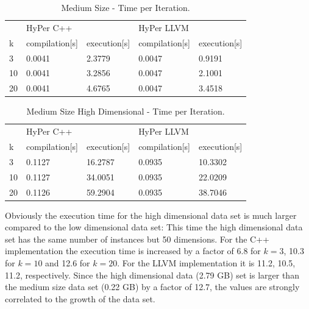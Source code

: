 \begin{table}[htsb]
  \caption[Medium Size - Time per Iteration (Serial)]{Medium Size - Time per Iteration.}
  \label{tab:med_serial}
  \centering
  \begin{tabular}{l l l l l}
    \toprule
      & HyPer C++ & & HyPer LLVM & \\
      k & compilation[s] & execution[s] & compilation[s] & execution[s] \\
    \midrule
      3  & 0.0041 & 2.3779 & 0.0047 & 0.9191 \\
      10 & 0.0041 & 3.2856 & 0.0047 & 2.1001 \\
      20 & 0.0041 & 4.6765 & 0.0047 & 3.4518 \\
    \bottomrule
  \end{tabular}
\end{table}


\begin{table}[htsb]
  \caption[Medium Size High Dimensional - Time per Iteration (Serial)]{Medium Size High Dimensional - Time per Iteration.}
  \label{tab:med_hd_serial}
  \centering
  \begin{tabular}{l l l l l}
    \toprule
      & HyPer C++ & & HyPer LLVM & \\
      k & compilation[s] & execution[s] & compilation[s] & execution[s] \\
    \midrule
      3  & 0.1127 & 16.2787 & 0.0935 & 10.3302 \\
      10 & 0.1127 & 34.0051 & 0.0935 & 22.0209 \\
      20 & 0.1126 & 59.2904 & 0.0935 & 38.7046 \\
    \bottomrule
  \end{tabular}
\end{table}

Obviously the execution time for the high dimensional data set is much larger compared to the low dimensional data set: This time the high dimensional data set has the same number of instances but 50 dimensions. For the C++ implementation the execution time is increased by a factor of 6.8 for $k = 3$, 10.3 for $k = 10$ and 12.6 for $k = 20$. For the LLVM implementation it is 11.2, 10.5, 11.2, respectively. Since the high dimensional data (2.79 GB) set is larger than the medium size data set (0.22 GB) by a factor of 12.7, the values are strongly correlated to the growth of the data set.

